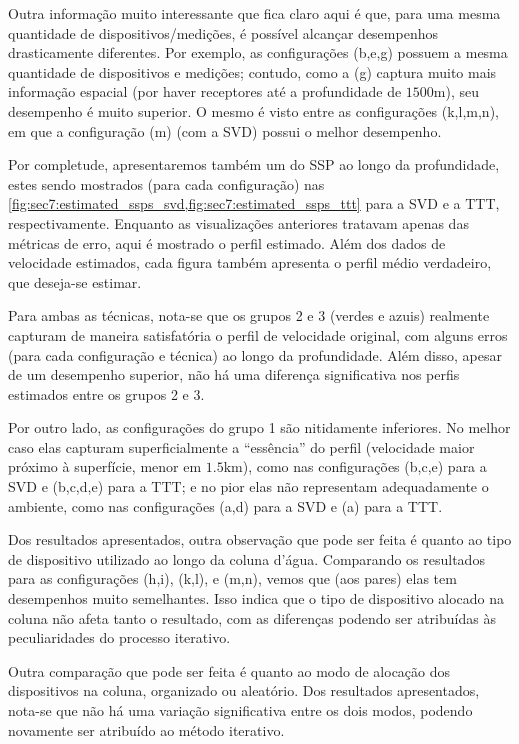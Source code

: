 \const Outra informação muito interessante que fica claro aqui é que, para uma mesma quantidade de dispositivos/medições, é possível alcançar desempenhos drasticamente diferentes. Por exemplo, as configurações (b,e,g) possuem a mesma quantidade de dispositivos e medições; contudo, como a (g) captura muito mais informação espacial (por haver receptores até a profundidade de $1500\si{\meter}$), seu desempenho é muito superior. O mesmo é visto entre as configurações (k,l,m,n), em que a configuração (m) (com a SVD) possui o melhor desempenho.



\const Por completude, apresentaremos também um  do SSP ao longo da profundidade, estes sendo mostrados (para cada configuração) nas \cref{fig:sec7:estimated_ssps_svd,fig:sec7:estimated_ssps_ttt} para a SVD e a TTT, respectivamente. Enquanto as visualizações anteriores tratavam apenas das métricas de erro, aqui é mostrado o perfil estimado. Além dos dados de velocidade estimados, cada figura também apresenta o perfil médio verdadeiro, que deseja-se estimar.

\const Para ambas as técnicas, nota-se que os grupos 2 e 3 (verdes e azuis) realmente capturam de maneira satisfatória o perfil de velocidade original, com alguns erros (para cada configuração e técnica) ao longo da profundidade. Além disso, apesar de um desempenho superior, não há uma diferença significativa nos perfis estimados entre os grupos 2 e 3.

\const Por outro lado, as configurações do grupo 1 são nitidamente inferiores. No melhor caso elas capturam superficialmente a ``essência'' do perfil (velocidade maior próximo à superfície, menor em $1.5\si{\kilo\meter}$), como nas configurações (b,c,e) para a SVD e (b,c,d,e) para a TTT; e no pior elas não representam adequadamente o ambiente, como nas configurações (a,d) para a SVD e (a) para a TTT.
%


\const Dos resultados apresentados, outra observação que pode ser feita é quanto ao tipo de dispositivo utilizado ao longo da coluna d'água. Comparando os resultados para as configurações (h,i), (k,l), e (m,n), vemos que (aos pares) elas tem desempenhos muito semelhantes. Isso indica que o tipo de dispositivo alocado na coluna não afeta tanto o resultado, com as diferenças podendo ser atribuídas às peculiaridades do processo iterativo.

\const Outra comparação que pode ser feita é quanto ao modo de alocação dos dispositivos na coluna, organizado ou aleatório. Dos resultados apresentados, nota-se que não há uma variação significativa entre os dois modos, podendo novamente ser atribuído ao método iterativo.


